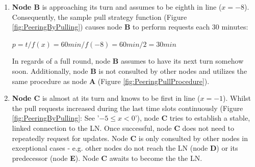 \begin{enumerate}
	\item \textbf{Node B} is approaching its turn and assumes to be eighth in line ($x = -8$).
	Consequently, the sample pull strategy function (Figure \ref{fig:PeeringByPulling}) causes node \textbf{B} to perform requests each 30 minutes:
	
	\begin{center}
		$p = t/f(x) = 60min/f(-8) = 60min/2 = 30min$
	\end{center}
	
	In regards of a full round, node \textbf{B} assumes to have its next turn somehow soon.
	Additionally, node \textbf{B} is not consulted by other nodes and utilizes the same procedure as node \textbf{A} (Figure \ref{fig:PeeringPullProcedure}).
	
	\item \textbf{Node C} is almost at its turn and knows to be first in line ($x = -1$).
	Whilst the pull requests increased during the last time slots continuously (Figure \ref{fig:PeeringByPulling}: See '$-5 \leq x < 0$'), node \textbf{C} tries to establish a stable, linked connection to the \gls{LN}.
	Once successful, node \textbf{C} does not need to repeatedly request for updates.
	Node \textbf{C} is only consulted by other nodes in exceptional cases - e.g. other nodes do not reach the \gls{LN} (node \textbf{D}) or its predecessor (node \textbf{E}).
	Node \textbf{C} awaits to become the the \gls{LN}.
	
	\begin{figure}
	\end{figure}
	

\end{enumerate}
